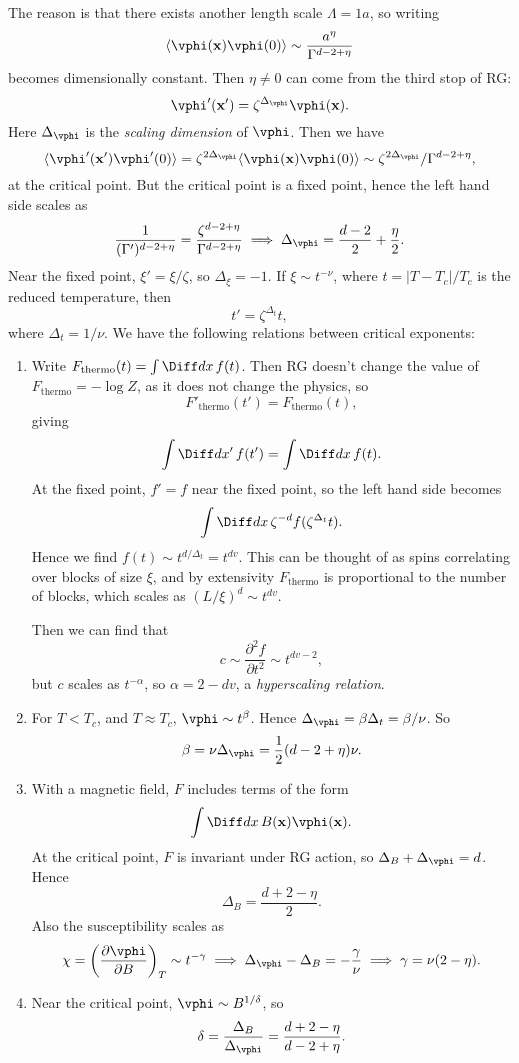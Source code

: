 \documentclass[12pt]{article}
\begin{document}
The reason is that there exists another length scale $\Lambda = 1a$, so writing
\[
\langle \vphi(\mathbf{x}) \vphi(0) \rangle \sim \frac{a^{\eta}}{\Gamma^{d - 2 + \eta}}
\]
becomes dimensionally constant. Then $\eta \neq 0$ can come from the third stop of RG:
\[
\vphi' (\mathbf{x}') = \zeta^{\Delta_{\vphi}} \vphi(\mathbf{x}).
\]
Here $\Delta_{\vphi}$ is the \emph{scaling dimension} of $\vphi$. Then we have
\[
\langle \vphi'(\mathbf{x}') \vphi'(0) \rangle = \zeta^{2 \Delta_{\vphi}} \langle \vphi(\mathbf{x}) \vphi(0) \rangle \sim \zeta^{2 \Delta_{\vphi}} / \Gamma^{d - 2 + \eta},
\]
at the critical point. But the critical point is a fixed point, hence the left hand side scales as
\[
\frac{1}{(\Gamma')^{d - 2 + \eta}} = \frac{\zeta^{d - 2 + \eta}}{\Gamma^{d - 2 + \eta}} \implies \Delta_{\vphi} = \frac{d - 2}{2} + \frac{\eta}{2}.
\]
Near the fixed point, $\xi' = \xi/\zeta$, so $\Delta_{\xi} = -1$. If $\xi \sim t^{-\nu}$, where $t = |T - T_c|/T_c$ is the reduced temperature, then
\[
t' = \zeta^{\Delta_t} t,
\]
where $\Delta_t = 1/\nu$. We have the following relations between critical exponents:
\begin{enumerate}
	\item Write $F_{\mathrm{thermo}}(t) = \int \Diff d x \, f(t)$. Then RG doesn't change the value of $F_{\mathrm{thermo}} = - \log Z$, as it does not change the physics, so
		\[
		F'_{\mathrm{thermo}}(t') = F_{\mathrm{thermo}}(t),
		\]
		giving
		\[
		\int \Diff d x'\, f(t') = \int \Diff d x \, f(t).
		\]
		At the fixed point, $f' = f$ near the fixed point, so the left hand side becomes
		\[
		\int \Diff d x \, \zeta^{-d} f(\zeta^{\Delta_t} t).
		\]
		Hence we find $f(t) \sim t^{d/\Delta_t} = t^{dv}$. This can be thought of as spins correlating over blocks of size $\xi$, and by extensivity $F_{\mathrm{thermo}}$ is proportional to the number of blocks, which scales as $(L/\xi)^{d} \sim t^{dv}$.

		Then we can find that
		\[
		c \sim \frac{\partial^2 f}{\partial t^2} \sim t^{dv - 2},
		\]
		but $c$ scales as $t^{-\alpha}$, so $\alpha = 2 - dv$, a \emph{hyperscaling relation}.
	\item For $T < T_c$, and $T \approx T_c$, $\vphi \sim t^{\beta}$. Hence $\Delta_{\vphi} = \beta \Delta_t = \beta/\nu$. So
		\[
		\beta = \nu \Delta_{\vphi} = \frac{1}{2}(d - 2 + \eta)\nu.
		\]
	\item With a magnetic field, $F$ includes terms of the form
		\[
		\int \Diff d x \, B(\mathbf{x}) \vphi(\mathbf{x}).
		\]
		At the critical point, $F$ is invariant under RG action, so $\Delta_B + \Delta_{\vphi} = d$. Hence
		\[
		\Delta_B = \frac{d + 2 - \eta}{2}.
		\]
		Also the susceptibility scales as
		\[
		\chi = \left( \frac{\partial \vphi}{\partial B} \right)_T \sim t^{-\gamma} \implies \Delta_{\vphi} - \Delta_B = - \frac{\gamma}{\nu} \implies \gamma = \nu(2 - \eta).
		\]
	\item Near the critical point, $\vphi \sim B^{1/\delta}$, so
		\[
		\delta = \frac{\Delta_B}{\Delta_{\vphi}} = \frac{d + 2 - \eta}{d - 2 + \eta}.
		\]
\end{enumerate}
\end{document}
